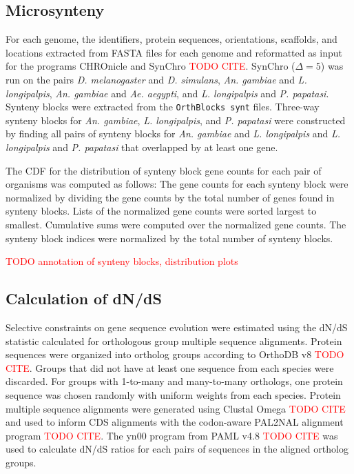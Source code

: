 \subsection{Microsynteny} \label{sec:synteny-methods-synchro}
For each genome, the identifiers, protein sequences, orientations, scaffolds, and locations extracted from FASTA files for each genome and reformatted as input for the programs CHROnicle and SynChro \textcolor{red}{TODO CITE}.  SynChro ($\Delta=5$) was run on the pairs \emph{D. melanogaster} and \emph{D. simulans}, \emph{An. gambiae} and \emph{L. longipalpis}, \emph{An. gambiae} and \emph{Ae. aegypti}, and \emph{L. longipalpis} and \emph{P. papatasi}.  Synteny blocks were extracted from the \texttt{OrthBlocks synt} files.  Three-way synteny blocks for \emph{An. gambiae}, \emph{L. longipalpis}, and \emph{P. papatasi} were constructed by finding all pairs of synteny blocks for \emph{An. gambiae} and \emph{L. longipalpis} and \emph{L. longipalpis} and \emph{P. papatasi} that overlapped by at least one gene.  

The CDF for the distribution of synteny block gene counts for each pair of organisms was computed as follows: The gene counts for each synteny block were normalized by dividing the gene counts by the total number of genes found in synteny blocks. Lists of the normalized gene counts were sorted largest to smallest.  Cumulative sums were computed over the normalized gene counts. The synteny block indices were normalized by the total number of synteny blocks.

\textcolor{red}{TODO annotation of synteny blocks, distribution plots}

\subsection{Calculation of dN/dS}

Selective constraints on gene sequence evolution were estimated using the dN/dS statistic calculated for orthologous group multiple sequence alignments. 
Protein sequences were organized into ortholog groups according to OrthoDB v8 \textcolor{red}{TODO CITE}. Groups that did not have at least one sequence from each species were discarded.  For groups with 1-to-many and many-to-many orthologs, one protein sequence was chosen randomly with uniform weights from each species. Protein multiple sequence alignments were generated using Clustal Omega \textcolor{red}{TODO CITE} and used to inform CDS alignments with the codon-aware PAL2NAL alignment program \textcolor{red}{TODO CITE}.  The yn00 program from PAML v4.8 \textcolor{red}{TODO CITE} was used to calculate dN/dS ratios for each pairs of sequences in the aligned ortholog groups.

